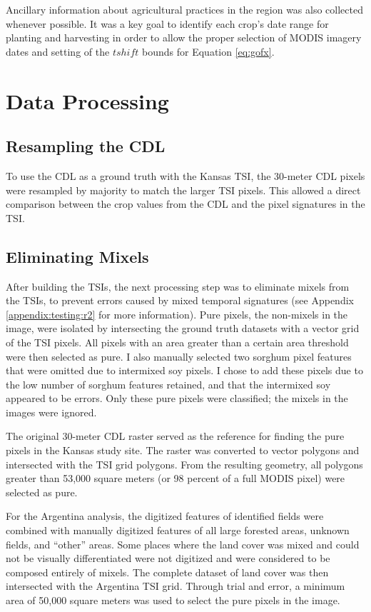 Ancillary information about agricultural practices in the region was also collected whenever possible. It was a key goal to identify each crop's date range for planting and harvesting in order to allow the proper selection of MODIS imagery dates and setting of the $tshift$ bounds for Equation \ref{eq:gofx}.

\section{Data Processing}

\subsection{Resampling the CDL}

To use the CDL as a ground truth with the Kansas TSI, the 30-meter CDL pixels were resampled by majority to match the larger TSI pixels. This allowed a direct comparison between the crop values from the CDL and the pixel signatures in the TSI.

\subsection{Eliminating Mixels}

After building the TSIs, the next processing step was to eliminate mixels from the TSIs, to prevent errors caused by mixed temporal signatures (see Appendix \ref{appendix:testing:r2} for more information). Pure pixels, the non-mixels in the image, were isolated by intersecting the ground truth datasets with a vector grid of the TSI pixels. All pixels with an area greater than a certain area threshold were then selected as pure. I also manually selected two sorghum pixel features that were omitted due to intermixed soy pixels. I chose to add these pixels due to the low number of sorghum features retained, and that the intermixed soy appeared to be errors. Only these pure pixels were classified; the mixels in the images were ignored.

The original 30-meter CDL raster served as the reference for finding the pure pixels in the Kansas study site. The raster was converted to vector polygons and intersected with the TSI grid polygons. From the resulting geometry, all polygons greater than 53,000 square meters (or 98 percent of a full MODIS pixel) were selected as pure.

For the Argentina analysis, the digitized features of identified fields were combined with manually digitized features of all large forested areas, unknown fields, and ``other'' areas. Some places where the land cover was mixed and could not be visually differentiated were not digitized and were considered to be composed entirely of mixels. The complete dataset of land cover was then intersected with the Argentina TSI grid. Through trial and error, a minimum area of 50,000 square meters was used to select the pure pixels in the image.

